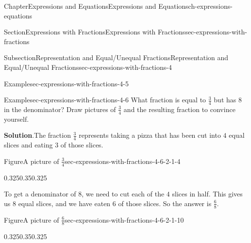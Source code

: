 \documentclass[twoside,11pt,]{book}
\newcommand{\blocktitlefont}{\relax}
\numberwithin{equation}{chapter}
\begin{document}
\begin{chapterptx}{Chapter}{Expressions and Equations}{}{Expressions and Equations}{}{}{ch-expressions-equations}
\begin{sectionptx}{Section}{Expressions with Fractions}{}{Expressions with Fractions}{}{}{sec-expressions-with-fractions}
\begin{subsectionptx}{Subsection}{Representation and Equal\slash{}Unequal Fractions}{}{Representation and Equal\slash{}Unequal Fractions}{}{}{sec-expressions-with-fractions-4}
\begin{example}{Example}{}{sec-expressions-with-fractions-4-5}
\end{example}
\begin{example}{Example}{}{sec-expressions-with-fractions-4-6}%
What fraction is equal to \(\frac34\) but has \(8\) in the denominator? Draw pictures of \(\frac34\) and the resulting fraction to convince yourself.%
\par\smallskip%
\noindent\textbf{\blocktitlefont Solution}.\hypertarget{sec-expressions-with-fractions-4-6-2}{}\quad{}The fraction \(\frac34\) represents taking a pizza that has been cut into \(4\) equal slices and eating \(3\) of those slices. \begin{figureptx}{Figure}{A picture of \(\frac34\)}{sec-expressions-with-fractions-4-6-2-1-4}{}%
\begin{image}{0.325}{0.35}{0.325}{}%
%
\end{image}%
\tcblower
\end{figureptx}%
 To get a denominator of \(8\), we need to cut each of the \(4\) slices in half. This gives us \(8\) equal slices, and we have eaten \(6\) of those slices. So the answer is \(\frac68\). \begin{figureptx}{Figure}{A picture of \(\frac68\)}{sec-expressions-with-fractions-4-6-2-1-10}{}%
\begin{image}{0.325}{0.35}{0.325}{}%
\end{image}
\end{figureptx}
\end{example}
\end{subsectionptx}
\end{sectionptx}
\end{chapterptx}
\end{document}
